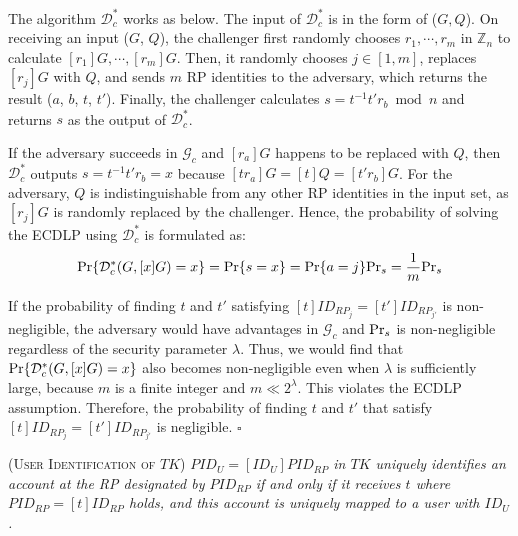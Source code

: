 The algorithm $\mathcal{D}^*_c$ works as below.
The input of $\mathcal{D}^*_c$ is in the form of ($G, Q$). On receiving an input ($G$, $Q$), the challenger first randomly chooses $r_1, \cdots, r_m$ in $\mathbb{Z}_n$ to calculate $[r_1]G, \cdots, [r_m]G$.
Then, it randomly chooses $j \in [1,m]$, replaces $[r_j]G$ with $Q$, and sends $m$ RP identities to the adversary, which returns the result ($a$, $b$, $t$, $t'$). Finally, the challenger calculates $s = t^{-1}t'r_b \bmod n$ and returns $s$ as the output of $\mathcal{D}^*_c$.

If the adversary succeeds in $\mathcal{G}_c$ and $[r_a]G$ happens to be replaced with $Q$, then $\mathcal{D}^*_c$ outputs $s=t^{-1}t'r_b =x$ because $[tr_a]G = [t]Q = [t'r_b]G$. For the adversary, $Q$ is indistinguishable from any other RP identities in the input set, as $[r_j]G$ is randomly replaced by the challenger.
Hence, the probability of solving the ECDLP using $\mathcal{D}^*_c$ is formulated as:
\begin{equation*}
{\rm Pr}\{\mathcal{D}^*_c(G, [x]G)=x\} = {\rm Pr}\{s = x\}={\rm Pr}\{a=j\}{\rm Pr}_s=\frac{1}{m}{\rm Pr}_s
\end{equation*}

If the probability of finding $t$ and $t'$ satisfying $[t]ID_{RP_j} = [t']ID_{RP_{j'}}$ is non-negligible, the adversary would have advantages  in $\mathcal{G}_c$ and ${\rm Pr}_s$ is non-negligible regardless of the security parameter $\lambda$.
Thus, we would find that ${\rm Pr}\{\mathcal{D}^*_c(G, [x]G)=x\}$ also becomes non-negligible even when $\lambda$ is sufficiently large, because $m$ is a finite integer and $m \ll 2^\lambda$.
\oldc
This violates the ECDLP assumption. Therefore, the probability of finding $t$ and $t'$ that satisfy $[t]ID_{RP_j} = [t']ID_{RP_{j'}}$ is negligible. \hfill $\square$

\newc
\begin{thm}
\textsc{(User Identification of $TK$)} \emph{$PID_U= [ID_U]PID_{RP}$ in $TK$ uniquely identifies an account at the RP designated by $PID_{RP}$ if and only if it receives $t$ where $PID_{RP} = [t]ID_{RP}$ holds, and this account is uniquely mapped to a user with $ID_U$.}
\label{thm-user-id}
\end{thm}

